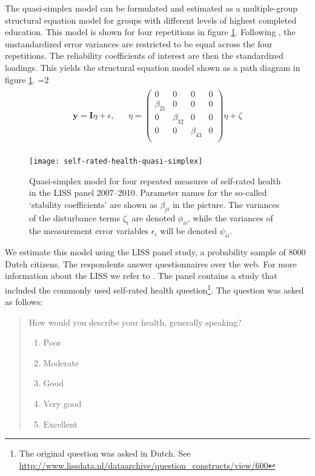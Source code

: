 \documentclass[a4paper, 11pt]{article}
\newcommand{\0}{\boldsymbol{0}}
\begin{document}
The quasi-simplex model can be formulated and estimated as a multiple-group structural equation model for groups with different  levels of highest completed education. This model is shown for four repetitions in figure 
\ref{fig:model}. Following \cite{wiley35wiley}, the unstandardized error variances are restricted to be equal across the four repetitions. The reliability coefficients of interest are then the standardized loadings. This yields the  structural equation model shown as a path diagram in figure \ref{fig:model}.
=2
\begin{eqnarray*}\begin{split}
\textbf{y} =  \textbf{I} {\eta} + \epsilon,& &
{\eta} = \begin{pmatrix}
	0 & 0 & 0 & 0\\
	\beta_{21} & 0 & 0 & 0\\
	0 & \beta_{32} & 0 & 0\\
	0 & 0 & \beta_{43} & 0\\	
\end{pmatrix} {\eta} + \zeta
\end{split}
\end{eqnarray*}
\fi


\begin{figure}[bt]\begin{center}
\caption{Quasi-simplex model for four repeated measures of self-rated health in the LISS panel 2007--2010. Parameter names for the 
	so-called `stability coefficients' are shown as $\beta_{ji}$ in the picture. The variances of the disturbance terms $\zeta_i$ are denoted
	$\phi_{ii}$, while the variances of the measurement error variables $\epsilon_i$ will be denoted $\psi_{ii}$.}
\label{fig:model}
\texttt{[image: self-rated-health-quasi-simplex]}
\end{center}
\end{figure}

We estimate this model using the LISS panel study, a probability sample 
of 8000 Dutch citizens. The respondents answer questionnaires over the web. For more information about the LISS we refer to \cite{scherpenzeel2011data}.
The  panel contains a study that included the commonly used self-rated health question\footnote{The original question was asked in Dutch. See \url{http://www.lissdata.nl/dataarchive/question_constructs/view/600}}. The question was asked as follows:
\begin{quote}
	How would you describe your health, generally speaking?
	
	\begin{enumerate}  \setlength{\itemsep}{0pt}  \setlength{\parskip}{0pt}
  \setlength{\parsep}{0pt}
		\item Poor
		\item Moderate
		\item Good
		\item Very good
		\item Excellent
	\end{enumerate}
\end{quote}
\end{document}
